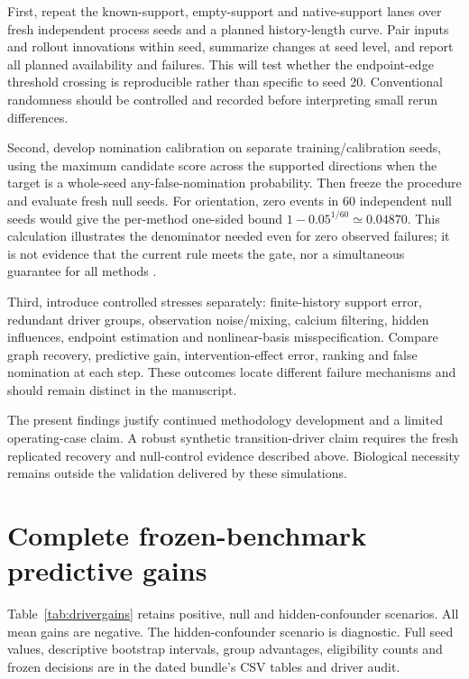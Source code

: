 \documentclass[11pt,a4paper]{article}
\begin{document}
First, repeat the known-support, empty-support and native-support lanes over fresh
independent process seeds and a planned history-length curve. Pair inputs and
rollout innovations within seed, summarize changes at seed level, and report all
planned availability and failures. This will test whether the endpoint-edge
threshold crossing is reproducible rather than specific to seed 20. Conventional
randomness should be controlled and recorded before interpreting small rerun
differences.

Second, develop nomination calibration on separate training/calibration seeds,
using the maximum candidate score across the supported directions when the target
is a whole-seed any-false-nomination probability. Then freeze the procedure and
evaluate fresh null seeds. For orientation, zero events in 60 independent null
seeds would give the per-method one-sided bound
$1-0.05^{1/60}\simeq0.04870$. This calculation illustrates the denominator needed
even for zero observed failures; it is not evidence that the current rule meets
the gate, nor a simultaneous guarantee for all methods
\citep{clopper1934confidence}.

Third, introduce controlled stresses separately: finite-history support error,
redundant driver groups, observation noise/mixing, calcium filtering, hidden
influences, endpoint estimation and nonlinear-basis misspecification. Compare
graph recovery, predictive gain, intervention-effect error, ranking and false
nomination at each step. These outcomes locate different failure mechanisms and
should remain distinct in the manuscript.

The present findings justify continued methodology development and a limited
operating-case claim. A robust synthetic transition-driver claim requires the
fresh replicated recovery and null-control evidence described above. Biological
necessity remains outside the validation delivered by these simulations.

\clearpage
\appendix
\section{Complete frozen-benchmark predictive gains}
\label{app:drivergains}

Table~\ref{tab:drivergains} retains positive, null and hidden-confounder scenarios.
All mean gains are negative. The hidden-confounder scenario is diagnostic.
Full seed values, descriptive bootstrap intervals, group advantages, eligibility
counts and frozen decisions are in the dated bundle's CSV tables and driver audit.
\end{document}
